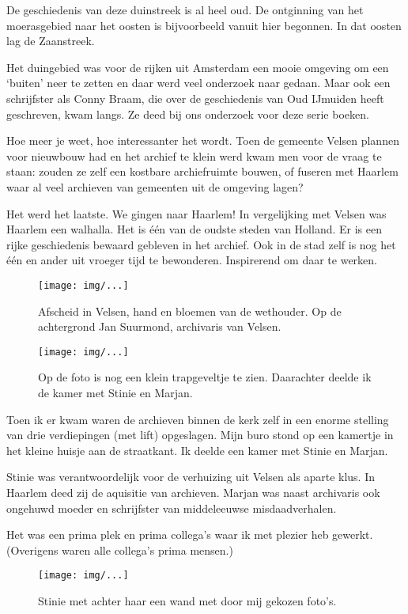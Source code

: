 \documentclass[10pt,twoside,openright]{memoir}
\begin{document}
De geschiedenis van deze duinstreek is al heel oud. De ontginning van het moerasgebied naar het oosten is bijvoorbeeld vanuit hier begonnen. In dat oosten lag de Zaanstreek. 

Het duingebied was voor de rijken uit Amsterdam een mooie omgeving om een `buiten' neer te zetten en daar werd veel onderzoek naar gedaan. Maar ook een schrijfster als Conny Braam, die over de geschiedenis van Oud IJmuiden heeft geschreven, kwam langs. Ze deed bij ons onderzoek voor deze serie boeken.

Hoe meer je weet, hoe interessanter het wordt. Toen de gemeente Velsen plannen voor nieuwbouw had en het archief te klein werd kwam men voor de vraag te staan: zouden ze zelf een kostbare archiefruimte bouwen, of fuseren met Haarlem waar al veel archieven van gemeenten uit de omgeving lagen? 

Het werd het laatste. We gingen naar Haarlem! In vergelijking met Velsen was Haarlem een walhalla. Het is één van de oudste steden van Holland. Er is een rijke geschiedenis bewaard gebleven in het archief. Ook in de stad zelf is nog het één en ander uit vroeger tijd te bewonderen. Inspirerend om daar te werken. 

\begin{figure}[t]
\texttt{[image: img/...]}
\caption{Afscheid in Velsen, hand en bloemen van de wethouder. Op de achtergrond Jan Suurmond, archivaris van Velsen.}
\end{figure}

\begin{figure}[t]
\texttt{[image: img/...]}
\caption{Op de foto is nog een klein trapgeveltje te zien. Daarachter deelde ik de kamer met Stinie en Marjan.}
\end{figure}

Toen ik er kwam waren de archieven binnen de kerk zelf in een enorme stelling van drie verdiepingen (met lift) opgeslagen. Mijn buro stond op een kamertje in het kleine huisje aan de straatkant. Ik deelde een kamer met Stinie en Marjan.

Stinie was verantwoordelijk voor de verhuizing uit Velsen als aparte klus. In Haarlem deed zij de aquisitie van archieven. Marjan was naast archivaris ook ongehuwd moeder en schrijfster van middeleeuwse misdaadverhalen.

Het was een prima plek en prima collega’s waar ik met plezier heb gewerkt. (Overigens waren alle collega’s prima mensen.)

\begin{figure}[t]
\texttt{[image: img/...]}
\caption{Stinie met achter haar een wand met door mij gekozen foto's.}
\end{figure}
\end{document}
